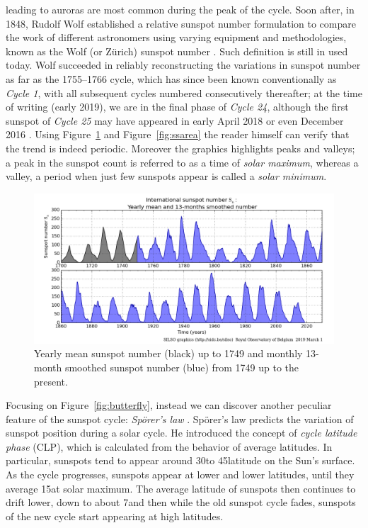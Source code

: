 leading to auroras are most common during the peak of the cycle. Soon after, in 1848, Rudolf Wolf established a relative sunspot number formulation to compare the work of different astronomers using varying equipment and methodologies, known as the Wolf (or Z\"{u}rich) sunspot number \cite{vaquero2007historical}. Such definition is still in used today. Wolf succeeded in reliably reconstructing the variations in sunspot number as far as the 1755--1766 cycle, which has since been known conventionally as \textit{Cycle 1}, with all subsequent cycles numbered consecutively thereafter; at the time of writing (early 2019), we are in the final phase of \textit{Cycle 24}, although the first sunspot of \textit{Cycle 25} may have appeared in early April 2018 \cite{cycle25-1}\cite{cycle25-2} or even December 2016 \cite{cycle25-3}. Using Figure~\ref{fig:SILSO2} and Figure~\ref{fig:ssarea} the reader himself can verify that the trend is indeed periodic. Moreover the graphics highlights peaks and valleys; a peak in the sunspot count is referred to as a time of \textit{solar maximum}, whereas a valley, a period when just few sunspots appear is called a \textit{solar minimum}.
\begin{figure}[t]
    \centering
    \includegraphics[width=\textwidth]{./pictures/SILSO2}
    \caption{Yearly mean sunspot number (black) up to 1749 and monthly 13-month smoothed sunspot number (blue) from 1749 up to the present.\cite{silso-graph}}
    \label{fig:SILSO2}
\end{figure}
Focusing on Figure~\ref{fig:butterfly}, instead we can discover another peculiar feature of the sunspot cycle: \textit{Sp\"{o}rer's law} \cite{ivanov2014sporer}. Sp\"{o}rer's law predicts the variation of sunspot position during a solar cycle. He introduced the concept of \textit{cycle latitude phase} (CLP), which is calculated from the behavior of average latitudes. In particular, sunspots tend to appear around 30\degree  to 45\degree  latitude on the Sun's surface. As the cycle progresses, sunspots appear at lower and lower latitudes, until they average 15\degree  at solar maximum. The average latitude of sunspots then continues to drift lower, down to about 7\degree  and then while the old sunspot cycle fades, sunspots of the new cycle start appearing at high latitudes.
